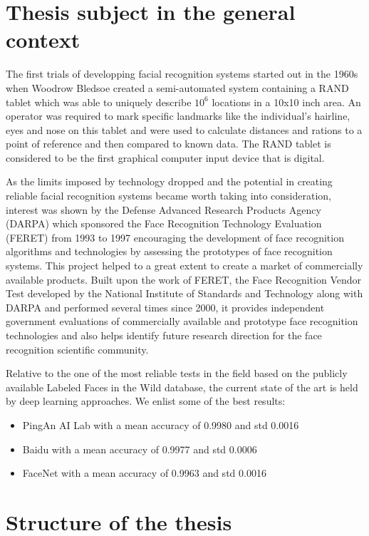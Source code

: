 \section{Thesis subject in the general context}
The first trials of developping facial recognition systems started out in the 1960s when Woodrow Bledsoe created a semi-automated system \cite{DavisMRETO64} containing a RAND tablet which was able to uniquely describe $10^{6}$ locations in a 10x10 inch area.
An operator was required to mark specific landmarks like the individual's  hairline, eyes and nose on this tablet and were used to calculate distances and rations to a point of reference and then compared to known data. The RAND tablet is considered to be the first graphical computer input device that is digital.

As the limits imposed by technology dropped and the potential in creating reliable facial recognition systems became worth taking into consideration, interest was shown by the Defense Advanced Research Products Agency (DARPA) which sponsored the Face Recognition Technology Evaluation (FERET) \cite{PhillipsJMHRSRP00} from 1993 to 1997 encouraging the development of face recognition algorithms and technologies by assessing the prototypes of face recognition systems. This project helped to a great extent to create a market of commercially available products.
Built upon the work of FERET, the Face Recognition Vendor Test \cite{PhillipsGMBTB03} developed by the National Institute of Standards and Technology \cite{FaceNist} along with DARPA and performed several times since 2000, it provides independent government evaluations of commercially available and prototype face recognition technologies and also helps identify future research direction for the face recognition scientific community.

Relative to the one of the most reliable tests in the field based on the publicly available Labeled Faces in the Wild database, the current state of the art is held by deep learning approaches. We enlist some of the best results:
\begin{itemize}
	\item PingAn AI Lab with a mean accuracy of 0.9980 and std 0.0016
	\item Baidu with a mean accuracy of 0.9977 and std 0.0006
	\item FaceNet with a mean accuracy of 0.9963 and std 0.0016
\end{itemize}

\section{Structure of the thesis} 

